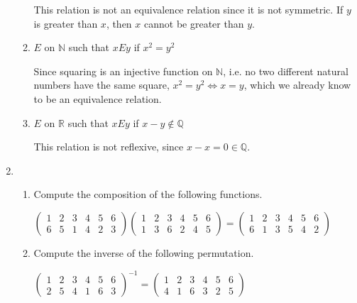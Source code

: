 \documentclass{article}
\newcommand*{\problem}{}
\newcommand{\R}{\mathbb{R}}
\newcommand{\N}{\mathbb{N}}
\newcommand{\Q}{\mathbb{Q}}
\begin{document}
\begin{enumerate}
\begin{enumerate}
                This relation is not an equivalence relation since it is not symmetric. If $y$ is
                greater than $x$, then $x$ cannot be greater than $y$.

            \item $E$ on $\N$ such that $x E y$ if $x^2 = y^2$

                Since squaring is an injective function on $\N$, i.e. no two different natural
                numbers have the same square, $x^2 = y^2 \iff x = y$, which we already
                know to be an equivalence relation.

            \item $E$ on $\R$ such that $x E y$ if $x - y \notin \Q$

                This relation is not reflexive, since $x - x = 0 \in \Q$.
        \end{enumerate}

    \item
        \begin{enumerate}
            \item \problem{Compute the composition of the following functions.}

                $
                    \left( \begin{array}{cccccc}
                            1 & 2 & 3 & 4 & 5 & 6 \\
                            6 & 5 & 1 & 4 & 2 & 3
                    \end{array} \right)
                    \left( \begin{array}{cccccc}
                            1 & 2 & 3 & 4 & 5 & 6 \\
                            1 & 3 & 6 & 2 & 4 & 5
                    \end{array} \right) =
                    \left( \begin{array}{cccccc}
                            1 & 2 & 3 & 4 & 5 & 6 \\
                            6 & 1 & 3 & 5 & 4 & 2
                    \end{array} \right)
                $

            \item \problem{Compute the inverse of the following permutation.}
                
                $\left( \begin{array}{cccccc}
                        1 & 2 & 3 & 4 & 5 & 6 \\
                        2 & 5 & 4 & 1 & 6 & 3
                \end{array} \right)^{-1} = 
                \left( \begin{array}{cccccc}
                        1 & 2 & 3 & 4 & 5 & 6 \\
                        4 & 1 & 6 & 3 & 2 & 5
                \end{array} \right)$
        \end{enumerate}
\end{enumerate}
\end{document}
